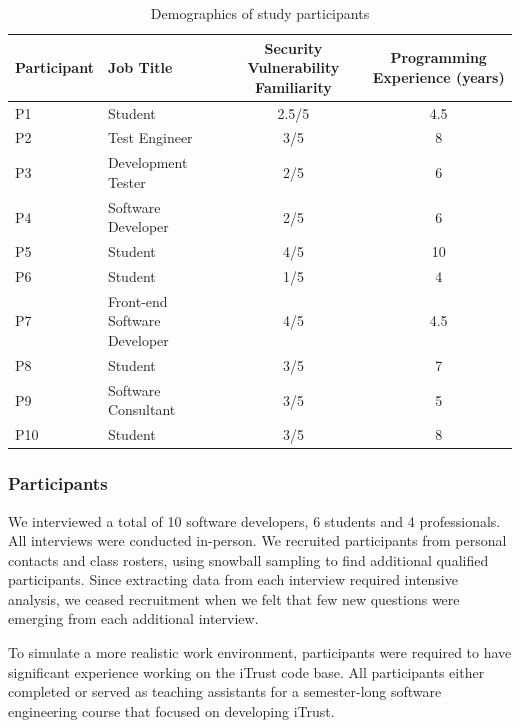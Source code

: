 \documentclass[conference]{IEEEtran}
\begin{document}
\begin{table} 
\centering
\caption{Demographics of study participants}
\begin{tabular}{|l|l|c|c|}
\rowcolor{gray!50}
\hline
    Participant			& Job Title 						& Security Vulnerability Familiarity 					& Programming Experience (years) \\
    \hline
    P1			    	& Student     			& 2.5/5												 	&  4.5    \\
    \hline
    P2			    	& Test Engineer    			& 3/5									    			&  8 		\\
    \hline
    P3 					& Development Tester       			& 2/5													&  6 	    	\\
    \hline
    P4					& Software Developer     			& 2/5				 									&  6     	\\
    \hline
    P5					& Student      			& 4/5													&  10 	\\
    \hline
    P6					& Student		    				& 1/5							    					& 4		\\
    \hline
    P7					& Front-end Software Developer    	& 4/5													& 4.5              \\
    \hline
    P8					& Student	    		& 3/5													& 7   \\
    \hline
    P9					& Software Consultant   	 		& 3/5													& 5	  		 \\
    \hline
    P10			    	& Student    			& 3/5										 			& 8	              \\
    \hline
\end{tabular}
\label{table:participants}
\end{table}



\subsubsection{Participants}

We interviewed a total of 10 software developers, 6 students and 4 professionals. 
All interviews were conducted in-person.
We recruited participants from personal contacts and class rosters, using snowball sampling to find additional qualified participants.
Since extracting data from each interview required intensive analysis, we ceased recruitment when we felt that few new questions were emerging from each additional interview.

To simulate a more realistic work environment, participants were required to have significant experience working on the iTrust code base. All participants either completed or served as teaching assistants for a semester-long software engineering course that focused on developing iTrust.
\end{document}
